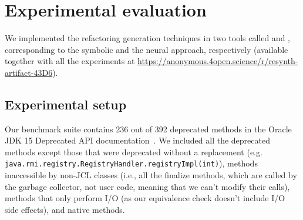 \documentclass[conference]{IEEEtran}
\begin{document}


\section{Experimental evaluation}\label{sec:experimental-results}

We implemented the refactoring generation techniques in two tools called \tool and \llm, corresponding to the symbolic and the neural approach, respectively (available together with all the experiments at \url{https://anonymous.4open.science/r/resynth-artifact-43D6}).

\subsection{Experimental setup}

Our benchmark suite contains 236 out of 392 deprecated methods in the Oracle
JDK 15 Deprecated API documentation~\cite{OracleJdk15DeprecatedAPI}.
We included all the deprecated methods except those that were deprecated without a replacement (e.g. \lstinline[breaklines=true]{java.rmi.registry.RegistryHandler.registryImpl(int)}), 
methods inaccessible by non-JCL classes (i.e., all the finalize methods, which are called by the garbage collector, not user code, meaning that we can't modify their calls), 
methods that only perform I/O (as our equivalence check doesn't include I/O side effects),
and native methods.
\end{document}

